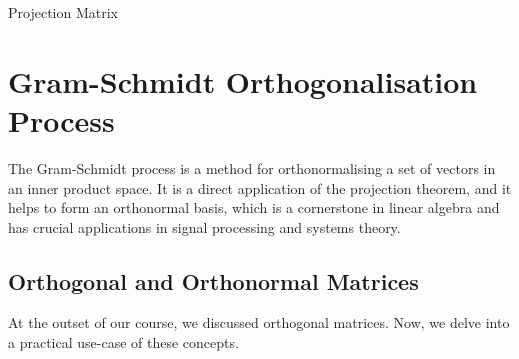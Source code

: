 \begin{definitionbox}{Projection Matrix}
\begin{figure}[H]
\end{figure}
 
\end{definitionbox}
\section{Gram-Schmidt Orthogonalisation Process}


The Gram-Schmidt process is a method for orthonormalising a set of vectors in an inner product space. It is a direct application of the projection theorem, and it helps to form an orthonormal basis, which is a cornerstone in linear algebra and has crucial applications in signal processing and systems theory.

\subsection*{Orthogonal and Orthonormal Matrices}

At the outset of our course, we discussed orthogonal matrices. Now, we delve into a practical use-case of these concepts.

